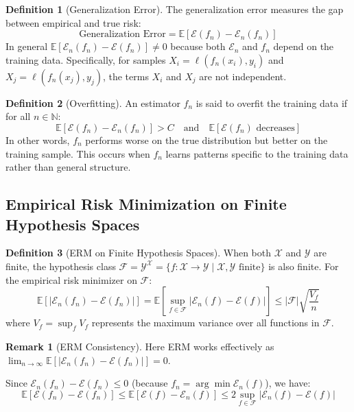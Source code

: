 \documentclass[12pt,a4paper]{article}
\theoremstyle{definition}
\newtheorem{definition}{Definition}[section]
\newtheorem{remark}{Remark}[section]
\begin{document}
\begin{definition}[Generalization Error]
The generalization error measures the gap between empirical and true risk:
\[
\text{Generalization Error} = \mathbb{E}[\mathcal{E}(f_n) - \mathcal{E}_n(f_n)]
\]
In general $\mathbb{E}[\mathcal{E}_n(f_n) - \mathcal{E}(f_n)] \neq 0$ because both $\mathcal{E}_n$ and $f_n$ depend on the training data. Specifically, for samples $X_i = \ell(f_n(x_i), y_i)$ and $X_j = \ell(f_n(x_j), y_j)$, the terms $X_i$ and $X_j$ are not independent.
\end{definition}

\begin{definition}[Overfitting]
An estimator $f_n$ is said to overfit the training data if for all $n \in \mathbb{N}$:
\[
\mathbb{E}[\mathcal{E}(f_n) - \mathcal{E}_n(f_n)] > C \quad \text{and} \quad \mathbb{E}[\mathcal{E}(f_n) \text{ decreases}]
\]
In other words, $f_n$ performs worse on the true distribution but better on the training sample. This occurs when $f_n$ learns patterns specific to the training data rather than general structure.
\end{definition}

\subsection{Empirical Risk Minimization on Finite Hypothesis Spaces}

\begin{definition}[ERM on Finite Hypothesis Spaces]
When both $\mathcal{X}$ and $\mathcal{Y}$ are finite, the hypothesis class $\mathcal{F} = \mathcal{Y}^\mathcal{X} = \{f: \mathcal{X} \to \mathcal{Y} \mid \mathcal{X}, \mathcal{Y} \text{ finite}\}$ is also finite. For the empirical risk minimizer on $\mathcal{F}$:
\[
\mathbb{E}[|\mathcal{E}_n(f_n) - \mathcal{E}(f_n)|] = \mathbb{E}\left[\sup_{f \in \mathcal{F}} |\mathcal{E}_n(f) - \mathcal{E}(f)|\right] \leq |\mathcal{F}| \sqrt{\frac{V_f}{n}}
\]
where $V_f = \sup_f V_f$ represents the maximum variance over all functions in $\mathcal{F}$.
\end{definition}

\begin{remark}[ERM Consistency]
Here ERM works effectively as $\lim_{n \to \infty} \mathbb{E}[|\mathcal{E}_n(f_n) - \mathcal{E}(f_n)|] = 0$.

Since $\mathcal{E}_n(f_n) - \mathcal{E}(f_n) \leq 0$ (because $f_n = \arg\min \mathcal{E}_n(f)$), we have:
\[
\mathbb{E}[\mathcal{E}(f_n) - \mathcal{E}(f_n)] \leq \mathbb{E}[\mathcal{E}(f) - \mathcal{E}_n(f)] \leq 2\sup_{f \in \mathcal{F}} |\mathcal{E}_n(f) - \mathcal{E}(f)|
\]
\end{remark}
\end{document}
